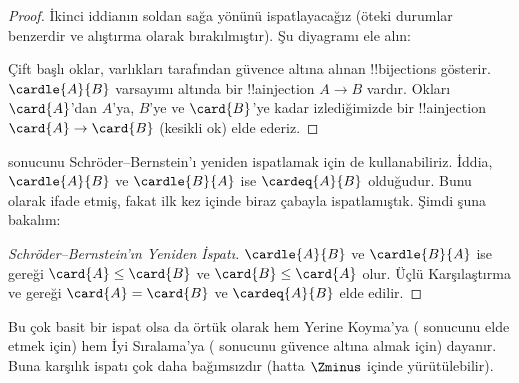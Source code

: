 \begin{proof}
İkinci iddianın soldan sağa yönünü ispatlayacağız (öteki durumlar benzerdir
ve alıştırma olarak bırakılmıştır). Şu diyagramı ele alın:
\begin{center}
\end{center}
Çift başlı oklar, varlıkları  tarafından güvence
altına alınan !!{bijection}s gösterir. $\cardle{A}{B}$ varsayımı altında
bir !!a{injection} $A\to B$ vardır. Okları $\card{A}$'dan $A$'ya,
$B$'ye ve $\card{B}$'ye kadar izlediğimizde bir !!a{injection}
$\card{A}\to\card{B}$ (kesikli ok) elde ederiz.
\end{proof}\noindent
{} sonucunu Schröder--Bernstein'ı yeniden
ispatlamak için de kullanabiliriz. İddia, $\cardle{A}{B}$ ve
$\cardle{B}{A}$ ise $\cardeq{A}{B}$ olduğudur. Bunu
 olarak ifade etmiş, fakat ilk
kez  içinde biraz çabayla
ispatlamıştık. Şimdi şuna bakalım:

\begin{proof}[Schröder--Bernstein'ın Yeniden İspatı]
$\cardle{A}{B}$ ve $\cardle{B}{A}$ ise
 gereği $\card{A}\leq\card{B}$ ve
$\card{B}\leq\card{A}$ olur. Üçlü Karşılaştırma ve
 gereği $\card{A}=\card{B}$ ve
$\cardeq{A}{B}$ elde edilir.
\end{proof}
\noindent
Bu çok basit bir ispat olsa da örtük olarak hem Yerine Koyma'ya
( sonucunu elde etmek
için) hem İyi Sıralama'ya ( sonucunu
güvence altına almak için) dayanır. Buna karşılık
 ispatı çok daha bağımsızdır (hatta
$\Zminus$ içinde yürütülebilir).

